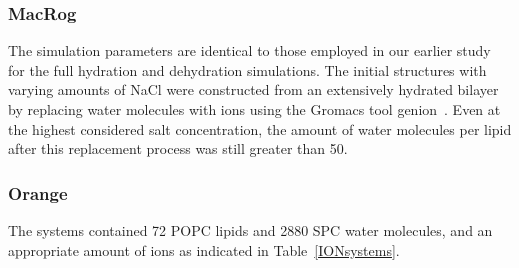 \documentclass[pre,aps,floatfix,authordate1-4,twocolumn]{revtex4-1}
\begin{document}
%
%
%
%

\subsubsection{MacRog}
The simulation parameters are identical to those employed in our earlier study~\cite{botan15} for the full 
hydration and dehydration simulations. The initial structures with varying amounts of NaCl were constructed from an 
extensively hydrated bilayer by replacing water molecules with ions using the Gromacs tool genion~\cite{gromacsMANUAL}. Even at the highest 
considered salt concentration, the amount of water molecules per lipid after this replacement process was still greater than 50.

\subsubsection{Orange}
The systems contained 72 POPC lipids and 2880 SPC water molecules, and an appropriate amount of ions as indicated in 
Table~\ref{IONsystems}.  
\end{document}

